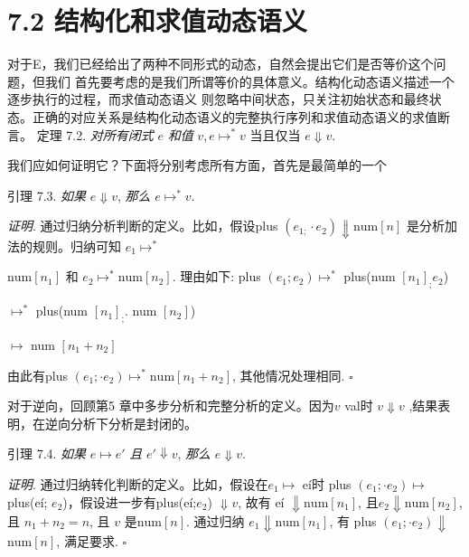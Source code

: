 \section{7.2 结构化和求值动态语义}%

对于E，我们已经给出了两种不同形式的动态，自然会提出它们是否等价这个问题，但我们
首先要考虑的是我们所谓等价的具体意义。结构化动态语义描述一个逐步执行的过程，而求值动态语义
则忽略中间状态，只关注初始状态和最终状态。正确的对应关系是结构化动态语义的完整执行序列和求值动态语义的求值断言。
定理 7.2. {\it 对所有闭式} $e$ {\it 和值} $v, e\mapsto^{*}v$ 当且仅当 $e\Downarrow v.$%

我们应如何证明它？下面将分别考虑所有方面，首先是最简单的一个%

引理 7.3. {\it 如果} $e\Downarrow v$, {\it 那么} $e\mapsto^{*}v.$

{\it 证明}. 通过归纳分析判断的定义。比如，假设plus $(e_{1;}\cdot e_{2}) \Downarrow \mathrm{n}\mathrm{u}\mathrm{m}[n]$ 是分析加法的规则。归纳可知 $e_{1} \mapsto^{*}$

$\mathrm{n}\mathrm{u}\mathrm{m}[n_{1}]$ 和 $e_{2}\mapsto^{*}\mathrm{n}\mathrm{u}\mathrm{m}[n_{2}]$. 理由如下:
plus $(e_{1};e_{2}) \mapsto^{*}$ plus(num $[n_{1}]_{;}e_{2}$)

$\mapsto^{*}$ plus(num $[n_{1}]_{;}$. num $[n_{2}]$)

$\mapsto$ num $[n_{1}+n_{2}]$

由此有plus $(e_{1};\cdot e_{2}) \mapsto^{*}\mathrm{n}\mathrm{u}\mathrm{m}[n_{1}+n_{2}]$, 其他情况处理相同. $\square $

对于逆向，回顾第5 章中多步分析和完整分析的定义。因为$v$ val时 $v\Downarrow v$ ,结果表明，在逆向分析下分析是封闭的。

引理 7.4. {\it 如果} $e\mapsto e'$ {\it 且} $e'\Downarrow v$, {\it 那么} $e\Downarrow v.$

{\it 证明}. 通过归纳转化判断的定义。比如，假设在$e_{1} \mapsto$ e\'{i}时 plus $(e_{1};\cdot e_{2}) \mapsto$plus(e\'{i}; $e_{2}$)，假设进一步有plus(e\'{i};$e_{2}$) $\Downarrow v$, 故有 e\'{i} $\Downarrow \mathrm{n}\mathrm{u}\mathrm{m}[n_{1}]$, 且$e_{2}\Downarrow \mathrm{n}\mathrm{u}\mathrm{m}[n_{2}]$, 且 $n_{1}+n_{2}=n$, 且 $v$ 是$\mathrm{n}\mathrm{u}\mathrm{m}[n]$. 通过归纳 $e_{1}\Downarrow \mathrm{n}\mathrm{u}\mathrm{m}[n_{1}]$, 有 plus $(e_{1};\cdot e_{2})\Downarrow$
$\mathrm{n}\mathrm{u}\mathrm{m}[n]$, 满足要求. $\square $
